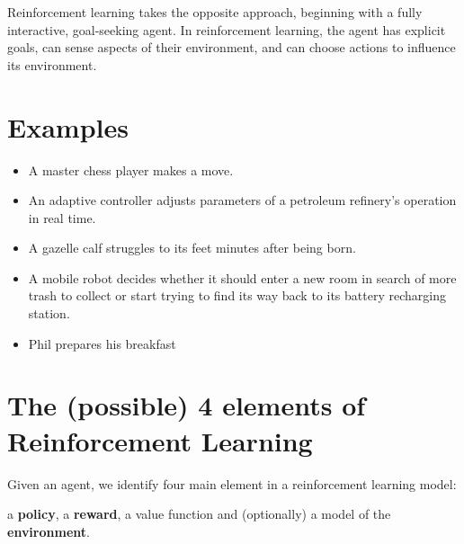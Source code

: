 \documentclass[
  letterpaper,
]{krantz}
\renewenvironment{quote}{\begin{VF}}{\end{VF}}
\theoremstyle{plain}
\theoremstyle{definition}
\theoremstyle{definition}
\theoremstyle{remark}
\begin{document}
Reinforcement learning takes the opposite approach, beginning with a
fully interactive, goal-seeking agent. In reinforcement learning, the
agent has explicit goals, can sense aspects of their environment, and
can choose actions to influence its environment.

\section{Examples}\label{examples}

\begin{itemize}
\item
  A master chess player makes a move.
\item
  An adaptive controller adjusts parameters of a petroleum refinery's
  operation in real time.
\item
  A gazelle calf struggles to its feet minutes after being born.
\item
  A mobile robot decides whether it should enter a new room in search of
  more trash to collect or start trying to find its way back to its
  battery recharging station.
\item
  Phil prepares his breakfast
\end{itemize}

\section{The (possible) 4 elements of Reinforcement
Learning}\label{the-possible-4-elements-of-reinforcement-learning}

Given an agent, we identify four main element in a reinforcement
learning model:

\begin{quote}
a \textbf{policy}, a \textbf{reward}, a value function and (optionally)
a model of the \textbf{environment}.
\end{quote}
\end{document}
